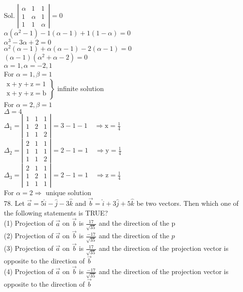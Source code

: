 \documentclass[10pt]{article}
\begin{document}
Sol. \(\left|\begin{array}{lll}\alpha & 1 & 1 \\ 1 & \alpha & 1 \\ 1 & 1 & \alpha\end{array}\right|=0\)\\
\(\alpha\left(\alpha^{2}-1\right)-1(\alpha-1)+1(1-\alpha)=0\)\\
\(\alpha^{3}-3 \alpha+2=0\)\\
\(\alpha^{2}(\alpha-1)+\alpha(\alpha-1)-2(\alpha-1)=0\)\\
\((\alpha-1)\left(\alpha^{2}+\alpha-2\right)=0\)\\
\(\alpha=1, \alpha=-2,1\)\\
For \(\alpha=1, \beta=1\)\\
\(\left.\begin{array}{l}\mathrm{x}+\mathrm{y}+\mathrm{z}=1 \\ \mathrm{x}+\mathrm{y}+\mathrm{z}=\mathrm{b}\end{array}\right\}\) infinite solution\\
For \(\alpha=2, \beta=1\)\\
\(\Delta=4\)\\
\(\Delta_{1}=\left|\begin{array}{lll}1 & 1 & 1 \\ 1 & 2 & 1 \\ 1 & 1 & 2\end{array}\right|=3-1-1 \quad \Rightarrow \mathrm{x}=\frac{1}{4}\)\\
\(\Delta_{2}=\left|\begin{array}{lll}2 & 1 & 1 \\ 1 & 1 & 1 \\ 1 & 1 & 2\end{array}\right|=2-1=1 \quad \Rightarrow \mathrm{y}=\frac{1}{4}\)\\
\(\Delta_{3}=\left|\begin{array}{lll}2 & 1 & 1 \\ 1 & 2 & 1 \\ 1 & 1 & 1\end{array}\right|=2-1=1 \quad \Rightarrow \mathrm{z}=\frac{1}{4}\)\\
For \(\alpha=2 \Rightarrow\) unique solution\\
78. Let \(\vec{a}=5 \hat{i}-\hat{j}-3 \hat{k}\) and \(\vec{b}=\hat{i}+3 \hat{j}+5 \hat{k}\) be two vectors. Then which one of the following statements is TRUE?\\
(1) Projection of \(\vec{a}\) on \(\vec{b}\) is \(\frac{17}{\sqrt{35}}\) and the direction of the p\\
(2) Projection of \(\vec{a}\) on \(\vec{b}\) is \(\frac{-17}{\sqrt{35}}\) and the direction of the \(p\)\\
(3) Projection of \(\vec{a}\) on \(\vec{b}\) is \(\frac{17}{\sqrt{35}}\) and the direction of the projection vector is opposite to the direction of \(\vec{b}\)\\
(4) Projection of \(\vec{a}\) on \(\vec{b}\) is \(\frac{-17}{\sqrt{35}}\) and the direction of the projection vector is opposite to the direction of \(\vec{b}\)
\end{document}

